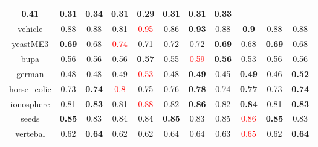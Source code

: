 \documentclass{article}%
\begin{document}
\begin{tabular}{c|cccccccccc}
{0.41
}&0.31&\textbf{0.34}&0.31&0.29&\textbf{0.31}&0.31&\textbf{0.33}\\%
\hline%
vehicle&0.88&0.88&0.81&\textcolor{red}{ 
0.95
}&0.86&\textbf{0.93}&0.88&\textbf{0.9}&0.88&0.88\\%
\hline%
yeastME3&\textbf{0.69}&0.68&\textcolor{red}{ 
0.74
}&0.71&0.72&0.72&\textbf{0.69}&0.68&\textbf{0.69}&0.68\\%
\hline%
bupa&0.56&0.56&0.56&\textbf{0.57}&0.55&\textcolor{red}{ 
0.59
}&\textbf{0.56}&0.53&0.56&0.56\\%
\hline%
german&0.48&0.48&0.49&\textcolor{red}{ 
0.53
}&0.48&\textbf{0.49}&0.45&\textbf{0.49}&0.46&\textbf{0.52}\\%
\hline%
horse\_colic&0.73&\textbf{0.74}&\textcolor{red}{ 
0.8
}&0.75&0.76&\textbf{0.78}&0.74&\textbf{0.77}&0.73&\textbf{0.74}\\%
\hline%
ionosphere&0.81&\textbf{0.83}&0.81&\textcolor{red}{ 
0.88
}&0.82&\textbf{0.86}&0.82&\textbf{0.84}&0.81&\textbf{0.83}\\%
\hline%
seeds&\textbf{0.85}&0.83&0.84&0.84&\textbf{0.85}&0.83&0.85&\textcolor{red}{ 
0.86
}&\textbf{0.85}&0.83\\%
\hline%
vertebal&0.62&\textbf{0.64}&0.62&0.62&0.64&0.64&0.63&\textcolor{red}{ 
0.65
}&0.62&\textbf{0.64}\\%
\hline%
\end{tabular}

%
\end{document}
